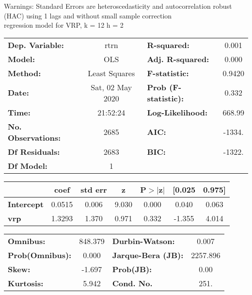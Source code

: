 Warnings: \newline
 [1] Standard Errors are heteroscedasticity and autocorrelation robust (HAC) using 1 lags and without small sample correction\\ 

regression model for VRP, k = 12 h = 2\begin{center}
\begin{tabular}{lclc}
\toprule
\textbf{Dep. Variable:}    &       rtrn       & \textbf{  R-squared:         } &     0.001   \\
\textbf{Model:}            &       OLS        & \textbf{  Adj. R-squared:    } &     0.000   \\
\textbf{Method:}           &  Least Squares   & \textbf{  F-statistic:       } &    0.9420   \\
\textbf{Date:}             & Sat, 02 May 2020 & \textbf{  Prob (F-statistic):} &    0.332    \\
\textbf{Time:}             &     21:52:24     & \textbf{  Log-Likelihood:    } &    668.99   \\
\textbf{No. Observations:} &        2685      & \textbf{  AIC:               } &    -1334.   \\
\textbf{Df Residuals:}     &        2683      & \textbf{  BIC:               } &    -1322.   \\
\textbf{Df Model:}         &           1      & \textbf{                     } &             \\
\bottomrule
\end{tabular}
\begin{tabular}{lcccccc}
                   & \textbf{coef} & \textbf{std err} & \textbf{z} & \textbf{P$> |$z$|$} & \textbf{[0.025} & \textbf{0.975]}  \\
\midrule
\textbf{Intercept} &       0.0515  &        0.006     &     9.030  &         0.000        &        0.040    &        0.063     \\
\textbf{vrp}       &       1.3293  &        1.370     &     0.971  &         0.332        &       -1.355    &        4.014     \\
\bottomrule
\end{tabular}
\begin{tabular}{lclc}
\textbf{Omnibus:}       & 848.379 & \textbf{  Durbin-Watson:     } &    0.007  \\
\textbf{Prob(Omnibus):} &   0.000 & \textbf{  Jarque-Bera (JB):  } & 2257.896  \\
\textbf{Skew:}          &  -1.697 & \textbf{  Prob(JB):          } &     0.00  \\
\textbf{Kurtosis:}      &   5.942 & \textbf{  Cond. No.          } &     251.  \\
\bottomrule
\end{tabular}
\end{center}

